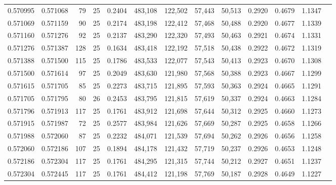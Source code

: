 \begin{tabular}{rrrrrrrrrrrrr}
0.570995 & 0.571068 &    79 &  25 &                                     0.2404 & 483,108 & 122,502 &  57,443 &  50,513 & 0.2920 & 0.4679 & 1.1347 \\
0.571069 & 0.571159 &    90 &  25 &                                     0.2174 & 483,198 & 122,412 &  57,468 &  50,488 & 0.2920 & 0.4677 & 1.1339 \\
0.571160 & 0.571276 &    92 &  25 &                                     0.2137 & 483,290 & 122,320 &  57,493 &  50,463 & 0.2921 & 0.4674 & 1.1331 \\
0.571276 & 0.571387 &   128 &  25 &                                     0.1634 & 483,418 & 122,192 &  57,518 &  50,438 & 0.2922 & 0.4672 & 1.1319 \\
0.571388 & 0.571500 &   115 &  25 &                                     0.1786 & 483,533 & 122,077 &  57,543 &  50,413 & 0.2923 & 0.4670 & 1.1308 \\
0.571500 & 0.571614 &    97 &  25 &                                     0.2049 & 483,630 & 121,980 &  57,568 &  50,388 & 0.2923 & 0.4667 & 1.1299 \\
0.571615 & 0.571705 &    85 &  25 &                                     0.2273 & 483,715 & 121,895 &  57,593 &  50,363 & 0.2924 & 0.4665 & 1.1291 \\
0.571705 & 0.571795 &    80 &  26 &                                     0.2453 & 483,795 & 121,815 &  57,619 &  50,337 & 0.2924 & 0.4663 & 1.1284 \\
0.571796 & 0.571913 &   117 &  25 &                                     0.1761 & 483,912 & 121,698 &  57,644 &  50,312 & 0.2925 & 0.4660 & 1.1273 \\
0.571915 & 0.571987 &    72 &  25 &                                     0.2577 & 483,984 & 121,626 &  57,669 &  50,287 & 0.2925 & 0.4658 & 1.1266 \\
0.571988 & 0.572060 &    87 &  25 &                                     0.2232 & 484,071 & 121,539 &  57,694 &  50,262 & 0.2926 & 0.4656 & 1.1258 \\
0.572060 & 0.572186 &   107 &  25 &                                     0.1894 & 484,178 & 121,432 &  57,719 &  50,237 & 0.2926 & 0.4653 & 1.1248 \\
0.572186 & 0.572304 &   117 &  25 &                                     0.1761 & 484,295 & 121,315 &  57,744 &  50,212 & 0.2927 & 0.4651 & 1.1237 \\
0.572304 & 0.572445 &   117 &  25 &                                     0.1761 & 484,412 & 121,198 &  57,769 &  50,187 & 0.2928 & 0.4649 & 1.1227 \\

\end{tabular}

